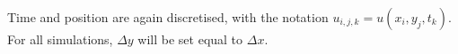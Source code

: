 Time and position are again discretised, with the notation \(u_{i,j,k} = u(x_i,y_j,t_k)\). For all simulations, \(\Delta y\) will be set equal to \(\Delta x\).











\clearpage
{}
\nocite{tveito2004introduction}
\printbibliography
\newpage





